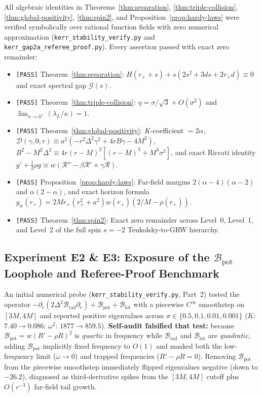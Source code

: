 \documentclass[11pt, a4paper]{article}
\theoremstyle{remark}
\begin{document}
All algebraic identities in Theorems~\ref{thm:separation}, \ref{thm:triple-collision}, \ref{thm:global-positivity}, \ref{thm:spin2}, and Proposition~\ref{prop:hardy-laws} were verified symbolically over rational function fields with zero numerical approximation (\texttt{kerr\_stability\_verify.py} and \texttt{kerr\_gap2a\_referee\_proof.py}). Every assertion passed with exact zero remainder:
\begin{itemize}
\item \texttt{[PASS]} Theorem~\ref{thm:separation}: $H(r_+ + s) + s(2s^2 + 3ds + 2r_+ d) \equiv 0$ and exact spectral gap $\mathcal{G}(s)$.
\item \texttt{[PASS]} Theorem~\ref{thm:triple-collision}: $\eta = \sigma/\sqrt{3} + O(\sigma^2)$ and $\lim_{\sigma \to 0^+}(\lambda_L/\kappa) = 1$.
\item \texttt{[PASS]} Theorem~\ref{thm:global-positivity}: $K$-coefficient $= 2\alpha$, $\mathcal{D}(\gamma, 0; r) \equiv a^2(-r^2\Delta^2\gamma^2 + 4rB\gamma - 4M^2)$, $B^2 - M^2\Delta^2 \equiv 4r(r-M)^2[(r-M)^3 + M^3\sigma^2]$, and exact Riccati identity $g' + \frac{1}{2}\rho g \equiv w(\mathcal{R}'' - \beta\mathcal{R}' + \gamma\mathcal{R})$.
\item \texttt{[PASS]} Proposition~\ref{prop:hardy-laws}: Far-field margins $2(\alpha-4)(\alpha-2)$ and $\alpha(2-\alpha)$, and exact horizon formula $g_w(r_+) = 2Mr_+(r_+^2+a^2)w(r_+)(2/M - \rho(r_+))$.
\item \texttt{[PASS]} Theorem~\ref{thm:spin2}: Exact zero remainder across Level~0, Level~1, and Level~2 of the full spin $s = -2$ Teukolsky-to-GRW hierarchy.
\end{itemize}

\subsection{Experiment E2 \& E3: Exposure of the $\mathcal{B}_{\mathrm{pot}}$ Loophole and Referee-Proof Benchmark}

An initial numerical probe (\texttt{kerr\_stability\_verify.py}, Part~2) tested the operator $-\partial_r(2\Delta^2\mathcal{B}_{\mathrm{rad}}\partial_r) + \mathcal{B}_{\mathrm{pot}} + \mathcal{B}_{\mathrm{lot}}$ with a piecewise $C^\infty$ smoothstep on $[3M, 4M]$ and reported positive eigenvalues across $\sigma \in \{0.5, 0.1, 0.01, 0.001\}$ ($K$: $7.40 \to 0.086$; $\omega^2$: $1877 \to 859.5$). \textbf{Self-audit falsified that test:} because $\mathcal{B}_{\mathrm{pot}} = w(R' - \rho R)^2$ is \emph{quartic} in frequency while $\mathcal{B}_{\mathrm{rad}}$ and $\mathcal{B}_{\mathrm{lot}}$ are \emph{quadratic}, adding $\mathcal{B}_{\mathrm{pot}}$ implicitly fixed frequency to $O(1)$ and masked both the low-frequency limit ($\omega \to 0$) and trapped frequencies ($R' - \rho R = 0$). Removing $\mathcal{B}_{\mathrm{pot}}$ from the piecewise smoothstep immediately flipped eigenvalues negative (down to $-26.2$), diagnosed as third-derivative spikes from the $[3M, 4M]$ cutoff plus $O(r^{-3})$ far-field tail growth.
\end{document}
